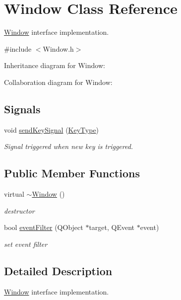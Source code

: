\hypertarget{class_window}{\section{Window Class Reference}
\label{class_window}
}


\hyperlink{class_window}{Window} interface implementation.  




{\ttfamily \#include $<$Window.\+h$>$}



Inheritance diagram for Window\+:


Collaboration diagram for Window\+:
\subsection*{Signals}
\begin{DoxyCompactItemize}
\item 
void \hyperlink{class_window_a13b006ce3a10501f8d469543eb338e87}{send\+Key\+Signal} (\hyperlink{_i_key_type_8h_aab0feaba617470cb4aa830dc5935238c}{Key\+Type})
\begin{DoxyCompactList}\small\item\em Signal triggered when new key is triggered. \end{DoxyCompactList}\end{DoxyCompactItemize}
\subsection*{Public Member Functions}
\begin{DoxyCompactItemize}
\item 
virtual \hyperlink{class_window_a245d821e6016fa1f6970ccbbedd635f6}{$\sim$\+Window} ()
\begin{DoxyCompactList}\small\item\em destructor \end{DoxyCompactList}\item 
bool \hyperlink{class_window_aad57aed8eca5414320b571e5f35f385b}{event\+Filter} (Q\+Object $\ast$target, Q\+Event $\ast$event)
\begin{DoxyCompactList}\small\item\em set event filter \end{DoxyCompactList}\end{DoxyCompactItemize}


\subsection{Detailed Description}
\hyperlink{class_window}{Window} interface implementation. 

